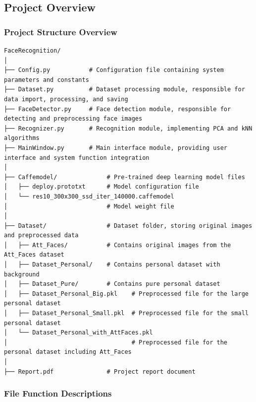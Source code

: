 \documentclass{article}
\begin{document}
\subsection{Project Overview}

\subsubsection{Project Structure Overview}
\begin{lstlisting}[basicstyle=\scriptsize\ttfamily]
FaceRecognition/
│
├── Config.py           # Configuration file containing system parameters and constants
├── Dataset.py          # Dataset processing module, responsible for data import, processing, and saving
├── FaceDetector.py     # Face detection module, responsible for detecting and preprocessing face images
├── Recognizer.py       # Recognition module, implementing PCA and kNN algorithms
├── MainWindow.py       # Main interface module, providing user interface and system function integration
│
├── Caffemodel/              # Pre-trained deep learning model files
│   ├── deploy.prototxt      # Model configuration file
│   └── res10_300x300_ssd_iter_140000.caffemodel
│                            # Model weight file
│
├── Dataset/                 # Dataset folder, storing original images and preprocessed data
│   ├── Att_Faces/           # Contains original images from the Att_Faces dataset
│   ├── Dataset_Personal/    # Contains personal dataset with background
│   ├── Dataset_Pure/        # Contains pure personal dataset
│   ├── Dataset_Personal_Big.pkl    # Preprocessed file for the large personal dataset
│   ├── Dataset_Personal_Small.pkl  # Preprocessed file for the small personal dataset
│   └── Dataset_Personal_with_AttFaces.pkl
│                                   # Preprocessed file for the personal dataset including Att_Faces
│
├── Report.pdf               # Project report document
\end{lstlisting}

\subsubsection{File Function Descriptions}
\end{document}
